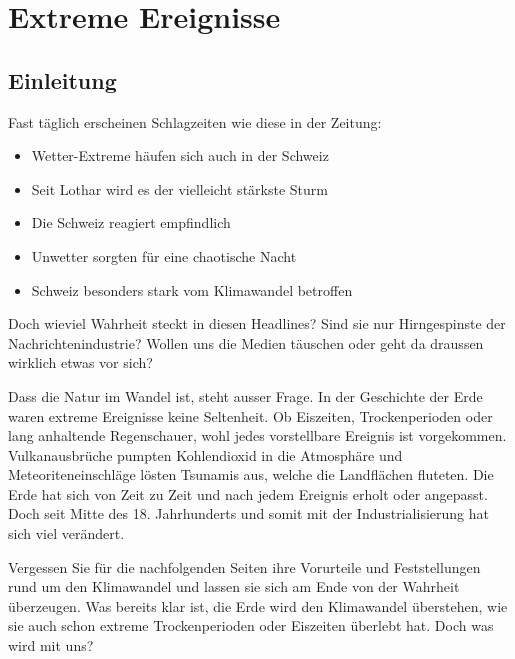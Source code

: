 %
%
%
\chapter{Extreme Ereignisse\label{chapter:thema}}
\begin{refsection}


\section{Einleitung}
Fast täglich erscheinen Schlagzeiten wie diese in der Zeitung:

\begin{itemize}
\item Wetter-Extreme häufen sich auch in der Schweiz
\item Seit Lothar wird es der vielleicht stärkste Sturm
\item Die Schweiz reagiert empfindlich
\item Unwetter sorgten für eine chaotische Nacht
\item Schweiz besonders stark vom Klimawandel betroffen
\end{itemize}

Doch wieviel Wahrheit steckt in diesen Headlines? Sind sie nur Hirngespinste der Nachrichtenindustrie? Wollen uns die Medien täuschen oder geht da draussen wirklich etwas vor sich?

Dass die Natur im Wandel ist, steht ausser Frage. In der Geschichte der Erde waren extreme Ereignisse keine Seltenheit. Ob Eiszeiten, Trockenperioden oder lang anhaltende Regenschauer, wohl jedes vorstellbare Ereignis ist vorgekommen. Vulkanausbrüche pumpten Kohlendioxid in die Atmosphäre und Meteoriteneinschläge lösten Tsunamis aus, welche die Landflächen fluteten. Die Erde hat sich von Zeit zu Zeit und nach jedem Ereignis erholt oder angepasst. Doch seit Mitte des 18. Jahrhunderts und somit mit der Industrialisierung hat sich viel verändert.

Vergessen Sie für die nachfolgenden Seiten ihre Vorurteile und Feststellungen rund um den Klimawandel und lassen sie sich am Ende von der Wahrheit überzeugen. Was bereits klar ist, die Erde wird den Klimawandel überstehen, wie sie auch schon extreme Trockenperioden oder Eiszeiten überlebt hat. Doch was wird mit uns?



\end{refsection}
